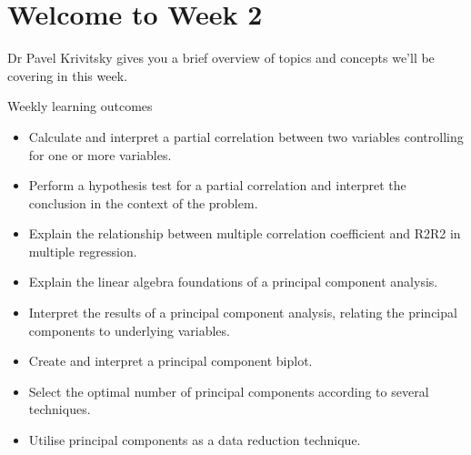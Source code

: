 \documentclass[11pt]{article}
\begin{document}
\section{Welcome to Week 2}\label{sec:welcome-to-week-2}
Dr Pavel Krivitsky gives you a brief overview of topics and concepts we'll be
covering in this week.

Weekly learning outcomes
\begin{itemize}
    \item Calculate and interpret a partial correlation between two variables controlling for one or more variables.
    \item Perform a hypothesis test for a partial correlation and interpret the conclusion in the context of the problem.
    \item Explain the relationship between multiple correlation coefficient and R2R2 in multiple regression.
    \item Explain the linear algebra foundations of a principal component analysis.
    \item Interpret the results of a principal component analysis, relating the principal components to underlying variables.
    \item Create and interpret a principal component biplot.
    \item Select the optimal number of principal components according to several techniques.
    \item Utilise principal components as a data reduction technique.
\end{itemize}
\end{document}
